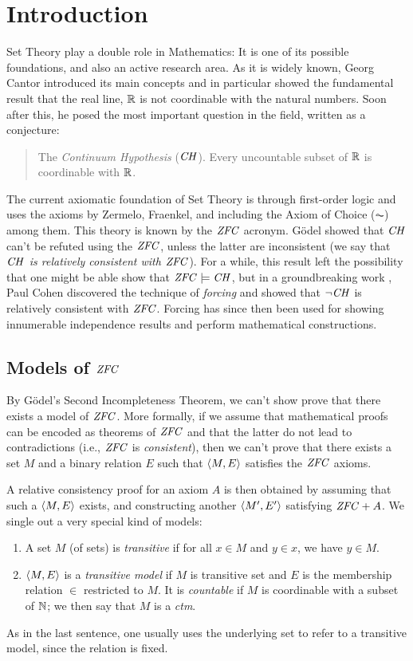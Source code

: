 \section{Introduction}\label{sec:introduction}
Set Theory play a double role in Mathematics: It is one of its
possible foundations, and also an active research area.
%
As it is widely known, Georg Cantor introduced its main concepts and in
particular showed the fundamental result that the real line, $\mathbb{R}$  is not
coordinable with the natural numbers. Soon after this, he posed the
most important question in the field, written as a conjecture:
\begin{quote}
  The \emph{Continuum Hypothesis} ($\mathit{CH}$). Every uncountable subset of $\mathbb{R}$ is
  coordinable with $\mathbb{R}$.
\end{quote}

The current  axiomatic foundation of Set Theory is through 
first-order logic and uses the axioms by  Zermelo, Fraenkel, and
including the Axiom of Choice ($\AC$) among them. This theory is
known by the $\mathit{ZFC}$ acronym. G\"odel showed that $\mathit{CH}$ can't be
refuted using the $\mathit{ZFC}$, unless the latter are inconsistent (we say
that \emph{$\mathit{CH}$ is relatively 
  consistent with  $\mathit{ZFC}$}). For a while, this result left the
possibility that one might be able show that $\mathit{ZFC}\models \mathit{CH}$, but in
a groundbreaking work \cite{Cohen-CH-PNAS}, Paul Cohen discovered the
technique of 
\emph{forcing} and showed that $\neg\mathit{CH}$ is relatively consistent with
$\mathit{ZFC}$. Forcing has since then been used for showing innumerable
independence results and perform mathematical constructions.


\subsection{Models of $\mathit{ZFC}$}
By G\"odel's Second Incompleteness Theorem, we can't show prove that
there exists a model of $\mathit{ZFC}$. More formally, if we assume that
mathematical proofs can be encoded as theorems of $\mathit{ZFC}$ and that
the latter do not lead to contradictions (i.e., $\mathit{ZFC}$ is
\emph{consistent}), then we can't prove that there exists a set $M$
and a binary relation $E$ such that $\langle M,E\rangle$ satisfies the $\mathit{ZFC}$
axioms.

A relative consistency proof for an axiom $A$ is then obtained by assuming that such a
$\langle M,E\rangle$ exists, and constructing another $\langle M',E'\rangle$
satisfying $\mathit{ZFC} + A$. We single out a very special kind of models:
%
\begin{definition}\label{def:transitive-model}
  \begin{enumerate}
  \item A set $M$ (of sets) is \emph{transitive} if for all $x\in M$ and 
    $y\in x$, we have $y\in M$.
  \item $\langle M,E\rangle$ is a \emph{transitive model} if $M$ is transitive
    set and  $E$ is the membership relation $\in$ restricted to
    $M$. It is \emph{countable} if $M$ is coordinable with a subset of
    $\mathbb{N}$; we then say that $M$ is a \emph{ctm}. 
  \end{enumerate}
\end{definition}
%
As in the last sentence, one usually uses the underlying set to refer to a transitive
model, since the relation is fixed. 

